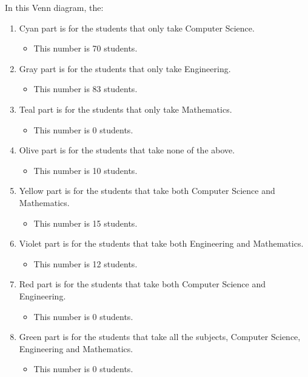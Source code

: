 \documentclass[a4paper,12pt]{article}
\begin{document}
In this Venn diagram, the:
\begin{enumerate}
  \item {\color{cyan}Cyan} part is for the students that only take Computer Science.
  \begin{itemize}
    \item This number is 70 students.
  \end{itemize}
  \item {\color{gray}Gray} part is for the students that only take Engineering.
  \begin{itemize}
    \item This number is 83 students.
  \end{itemize}
  \item {\color{teal}Teal} part is for the students that only take Mathematics.
  \begin{itemize}
    \item This number is 0 students.
  \end{itemize}
  \item {\color{olive}Olive} part is for the students that take none of the above.
  \begin{itemize}
    \item This number is 10 students.
  \end{itemize}
  \item {\color{yellow}Yellow} part is for the students that take both Computer Science and Mathematics.
  \begin{itemize}
    \item This number is 15 students.
  \end{itemize}
  \item {\color{violet}Violet} part is for the students that take both Engineering and Mathematics.
  \begin{itemize}
    \item This number is 12 students.
  \end{itemize}
  \item {\color{red}Red} part is for the students that take both Computer Science and Engineering.
  \begin{itemize}
    \item This number is 0 students.
  \end{itemize}
  \newpage
  \item {\color{green}Green} part is for the students that take all the subjects, Computer Science, Engineering and Mathematics.
  \begin{itemize}
    \item This number is 0 students.
  \end{itemize}
\end{enumerate}
\end{document}
